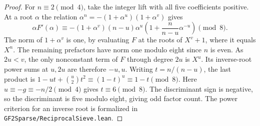 \documentclass[11pt]{article}
\begin{document}
\begin{proof}
For \(n\equiv2\pmod4\), take the integer lift with all five
coefficients positive. At a root \(\alpha\) the relation
\(\alpha^n=-(1+\alpha^u)(1+\alpha^v)\) gives
\[
 \alpha F'(\alpha)\equiv
  -(1+\alpha^v)(n-u)\alpha^u
  \left(1+\frac{n}{n-u}\alpha^{-u}\right)\pmod8 .
\]
The norm of \(1+\alpha^v\) is one, by evaluating \(F\) at the
roots of \(X^v+1\), where it equals \(X^n\). The remaining
prefactors have norm one modulo eight since \(n\) is even.
As \(2u<v\), the only nonconstant term of \(F\) through degree
\(2u\) is \(X^u\). Its inverse-root power sums at \(u,2u\)
are therefore \(-u,u\). Writing \(t=n/(n-u)\), the last
product is \(1-ut+\binom{u}{2}t^2\equiv(1-t)^u\equiv1-t\pmod8\).
Here \(u\equiv-g\equiv-n/2\pmod4\) gives \(t\equiv6\pmod8\).
The discriminant sign is negative, so the discriminant is five
modulo eight, giving odd factor count. The power criterion for
an inverse root is formalized in \nolinkurl{GF2Sparse/ReciprocalSieve.lean}.
\end{proof}
\end{document}
